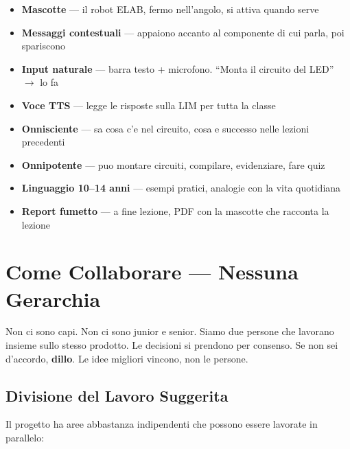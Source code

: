 \documentclass[11pt,a4paper]{article}
\begin{document}
\begin{itemize}[leftmargin=2em]
  \item \textbf{Mascotte} --- il robot ELAB, fermo nell'angolo, si attiva quando serve
  \item \textbf{Messaggi contestuali} --- appaiono accanto al componente di cui parla, poi spariscono
  \item \textbf{Input naturale} --- barra testo + microfono. ``Monta il circuito del LED'' $\rightarrow$ lo fa
  \item \textbf{Voce TTS} --- legge le risposte sulla LIM per tutta la classe
  \item \textbf{Onnisciente} --- sa cosa c'e nel circuito, cosa e successo nelle lezioni precedenti
  \item \textbf{Onnipotente} --- puo montare circuiti, compilare, evidenziare, fare quiz
  \item \textbf{Linguaggio 10--14 anni} --- esempi pratici, analogie con la vita quotidiana
  \item \textbf{Report fumetto} --- a fine lezione, PDF con la mascotte che racconta la lezione
\end{itemize}

\section{Come Collaborare --- Nessuna Gerarchia}

\begin{principiobox}
Non ci sono capi. Non ci sono junior e senior. Siamo due persone che lavorano insieme sullo stesso prodotto. Le decisioni si prendono per consenso. Se non sei d'accordo, \textbf{dillo}. Le idee migliori vincono, non le persone.
\end{principiobox}

\subsection{Divisione del Lavoro Suggerita}

Il progetto ha aree abbastanza indipendenti che possono essere lavorate in parallelo:
\end{document}
